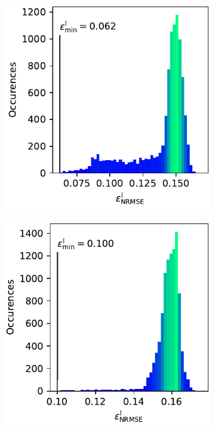 \documentclass[
  a4paper,  %
  twoside,  %
  bibliography=totoc,
  headsepline,
  cleardoublepage=empty,
  parskip=half,
  draft=false
]{scrbook}
\begin{document}
\newpage
\begin{mdframed}[style=style]
\begin{figure}[H]
\begin{subfigure}{.5\textwidth}
  \centering
   \includegraphics[width=0.95\linewidth]{graphics/ishigami_hist_2}
\vspace{3mm}
\label{fig:ishigami_hist_2}
\end{subfigure}%
\begin{subfigure}{.5\textwidth}
  \centering
   \includegraphics[width=0.95\linewidth]{graphics/ishigami_hist_1}

\end{subfigure}
\end{figure}
\end{mdframed}
\end{document}
